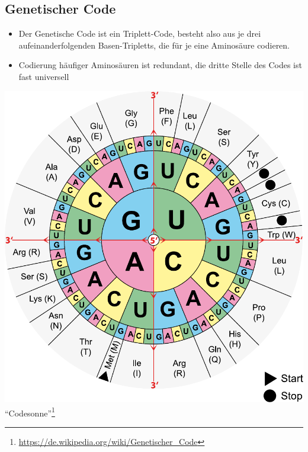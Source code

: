 \subsection{Genetischer Code}
\begin{itemize}
    \item Der Genetische Code ist ein Triplett-Code, besteht also aus je drei aufeinanderfolgenden Basen-Tripletts, die für je eine Aminosäure codieren.
    \item Codierung häufiger Aminosäuren ist redundant, die dritte Stelle des Codes ist fast universell
\end{itemize}

\includegraphics[width=1\textwidth]{lectures/V1/pix/Aminoacids_table.pdf}\\
``Codesonne''\footnote{\url{https://de.wikipedia.org/wiki/Genetischer_Code}}

